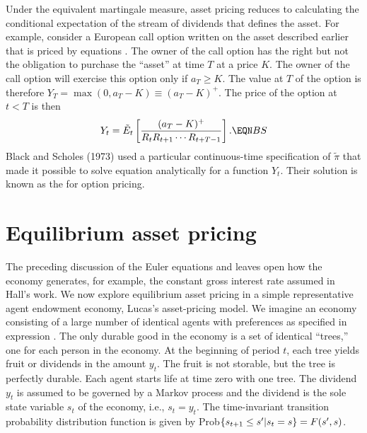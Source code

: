    Under the equivalent martingale measure, asset pricing
reduces to calculating the conditional expectation of
the stream of dividends that defines the asset.
For example, consider a European  %
 call option written on the asset described earlier
that is priced by equations .    The owner of the call
option has the right but not the obligation
to purchase the ``asset'' at time $T$ at a price
$K$.  The owner  of the call option will exercise this option
only if $a_T \geq K$.  The value at $T$ of the option is
therefore $ Y_T = \max(0, a_T - K) \equiv (a_T-K)^+$.  The price
of the option at $t <T$ is then
$$ Y_t = \tilde E_t \left[{(a_T-K)^+\over R_t R_{t+1} \cdots R_{t+T-1}}\right]
.  \EQN BS  $$
Black and Scholes (1973) used a particular continuous-time
 specification of $\tilde \pi$ that made it possible to
solve equation  analytically for a function
$Y_t$.  Their solution is known as
the  for option pricing.
 

\newpage

\section{Equilibrium asset pricing}\label{eq_asset_pricing}%
The preceding discussion of the Euler equations
 and  leaves open
how the economy generates, for example, the constant gross interest rate
assumed in Hall's work.  We now explore equilibrium asset pricing
in a  simple representative agent endowment economy,
Lucas's asset-pricing model.  We imagine an economy consisting of a large
number of identical agents with preferences as specified in expression
 .
The only durable good in the economy is a set of identical ``trees,''
one for each person  in the economy.
At the beginning of period $t$, each tree yields fruit or dividends in the
amount $y_t$.
The fruit is not storable, but the tree is perfectly durable.
Each agent starts life at time zero with one tree.
The dividend $y_t$ is assumed to be governed by a Markov process
and the dividend is the sole state variable $s_t$ of the economy, i.e.,
$s_t=y_t$. The time-invariant transition probability
distribution function is given by Prob$\{s_{{t+1}}\le s'|s_t=s\}=F(s',s)$.


